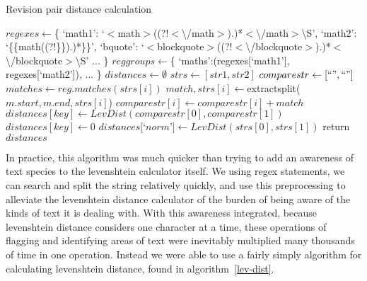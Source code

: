 \begin{algorithm}
  \caption{Revision pair distance calculation}\label{dist-calc}
  \begin{algorithmic}
    \State $regexes \gets $\{
    \Statex \tab`math1': `$<$math$>$((?!$<${\textbackslash}/math$>$).)*$<${\textbackslash}/math$>${\textbackslash}S',
    \Statex \tab`math2': `\{\{math((?!\}\}).)*\}\}',
    \Statex \tab`bquote': `$<$blockquote$>$((?!$<${\textbackslash}/blockquote$>$).)*$<${\textbackslash}/blockquote$>${\textbackslash}S'
    \Statex  \tab...
    \Statex\}
    \State $reggroups \gets $\{\label{dist-calc-groups}
    \Statex  \tab`maths':(regexes[`math1'], regexes[`math2']),
    \Statex  \tab...
    \Statex \}
    \State $distances \gets \emptyset$
    \State $strs \gets [str1, str2]$
    \State $comparestr \gets [``", ``"]$
    \State $matches \gets reg.matches(strs[i])$
    \State $match, strs[i] \gets $extractsplit($m.start, m.end, strs[i]$)
    \State $comparestr[i] \gets comparestr[i] + match$
    \EndFor
    \EndFor
    \State $distances[key] \gets LevDist(comparestr[0], comparestr[1])$ 
    \Else
    \State $distances[key] \gets 0$
    \EndIf
    \EndFor
    \State $distances[$`$norm$'$] \gets LevDist(strs[0], strs[1])$
    \State return $distances$
    \EndFunction
  \end{algorithmic}
\end{algorithm}

In practice, this algorithm was much quicker than trying to add an
awareness of text species to the levenshtein calculator itself. We
using regex statements, we can search and split the string relatively
quickly, and use this preprocessing to alleviate the levenshtein
distance calculator of the burden of being aware of the kinds of text
it is dealing with. With this awareness integrated, because
levenshtein distance considers one character at a time, these
operations of flagging and identifying areas of text were inevitably
multiplied many thousands of time in one operation. Instead we were
able to use a fairly simply algorithm for calculating levenshtein
distance, found in algorithm~\ref{lev-dist}.

